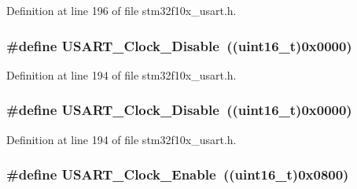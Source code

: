 Definition at line 196 of file stm32f10x\+\_\+usart.\+h.

\subsubsection[{\texorpdfstring{U\+S\+A\+R\+T\+\_\+\+Clock\+\_\+\+Disable}{USART_Clock_Disable}}]{\setlength{\rightskip}{0pt plus 5cm}\#define U\+S\+A\+R\+T\+\_\+\+Clock\+\_\+\+Disable~(({\bf uint16\+\_\+t})0x0000)}\hypertarget{group___u_s_a_r_t___clock_ga56c12b81d19853c093e0a373d0c52fb5}{}\label{group___u_s_a_r_t___clock_ga56c12b81d19853c093e0a373d0c52fb5}


Definition at line 194 of file stm32f10x\+\_\+usart.\+h.

\subsubsection[{\texorpdfstring{U\+S\+A\+R\+T\+\_\+\+Clock\+\_\+\+Disable}{USART_Clock_Disable}}]{\setlength{\rightskip}{0pt plus 5cm}\#define U\+S\+A\+R\+T\+\_\+\+Clock\+\_\+\+Disable~(({\bf uint16\+\_\+t})0x0000)}\hypertarget{group___u_s_a_r_t___clock_ga56c12b81d19853c093e0a373d0c52fb5}{}\label{group___u_s_a_r_t___clock_ga56c12b81d19853c093e0a373d0c52fb5}


Definition at line 194 of file stm32f10x\+\_\+usart.\+h.

\subsubsection[{\texorpdfstring{U\+S\+A\+R\+T\+\_\+\+Clock\+\_\+\+Enable}{USART_Clock_Enable}}]{\setlength{\rightskip}{0pt plus 5cm}\#define U\+S\+A\+R\+T\+\_\+\+Clock\+\_\+\+Enable~(({\bf uint16\+\_\+t})0x0800)}\hypertarget{group___u_s_a_r_t___clock_gacfe029e2ec4f49ddde031fd031654caa}{}\label{group___u_s_a_r_t___clock_gacfe029e2ec4f49ddde031fd031654caa}


